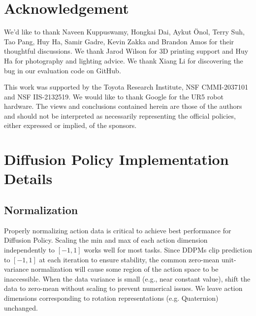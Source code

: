 \documentclass[Afour,sageh,times]{sagej}
\newcommand\todo[1]{\textcolor{red}{[TODO: #1]}}
\begin{document}
\section{Acknowledgement}

We'd like to thank Naveen Kuppuswamy, Hongkai Dai, Aykut Önol, Terry Suh, Tao Pang, Huy Ha, Samir Gadre, Kevin Zakka and Brandon Amos for their thoughtful discussions. We thank Jarod Wilson for 3D printing support and Huy Ha for photography and lighting advice. We thank Xiang Li for discovering the bug in our evaluation code on GitHub.



\begin{funding}
This work was supported by the Toyota Research Institute, NSF CMMI-2037101 and NSF IIS-2132519. We would like to thank Google for the UR5 robot hardware. The views and conclusions contained herein are those of the authors and should not be interpreted as necessarily representing the official policies, either expressed or implied, of the sponsors.
\end{funding}


%
% 


\appendix
\section{Diffusion Policy Implementation Details}

\subsection{Normalization}
Properly normalizing action data is critical to achieve best performance for Diffusion Policy. 
Scaling the min and max of each action dimension independently to $[-1,1]$ works well for most tasks. 
Since DDPMs clip prediction to $[-1,1]$ at each iteration to ensure stability, the common zero-mean unit-variance normalization will cause some region of the action space to be inaccessible. 
When the data variance is small (e.g., near constant value), shift the data to zero-mean without scaling to prevent numerical issues.
We leave action dimensions corresponding to rotation representations (e.g. Quaternion) unchanged.
\end{document}
